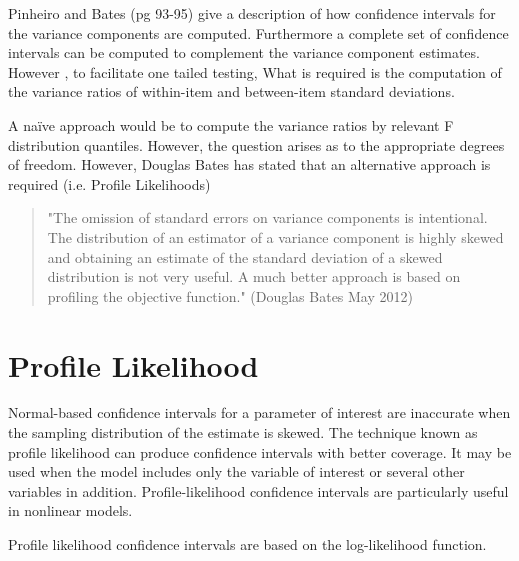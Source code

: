 \documentclass[12pt, a4paper]{report}
\theoremstyle{plain}
\theoremstyle{definition}
\theoremstyle{remark}
\begin{document}
	Pinheiro and Bates (pg 93-95) give a description of how confidence intervals for the variance components are computed. Furthermore a complete set of confidence intervals can be computed to complement the variance component estimates.
	However , to facilitate one tailed testing, What is required is the computation of the variance ratios of within-item and between-item standard deviations.
	
	A naïve approach would be to compute the variance ratios by relevant F distribution quantiles. However, the question arises as to the appropriate degrees of freedom. However, Douglas Bates has stated that an alternative approach is required (i.e. Profile Likelihoods)
	
	\begin{quote}
		"The omission of standard errors on variance components is intentional.
		The distribution of an estimator of a variance component is highly
		skewed and obtaining an estimate of the standard deviation of a skewed
		distribution is not very useful.  A much better approach is based on
		profiling the objective function." (Douglas Bates May 2012)
	\end{quote}
	
	
	\section{Profile Likelihood}
	Normal-based confidence intervals for a parameter of interest are inaccurate when the sampling distribution of the estimate is skewed. The technique known as profile likelihood can produce confidence intervals with better coverage. It may be used when the model includes only the variable of interest or several other variables in addition. Profile-likelihood confidence intervals are particularly useful in nonlinear models.
	
	Profile likelihood confidence intervals are based on the log-likelihood function.  
	
	
\end{document}
